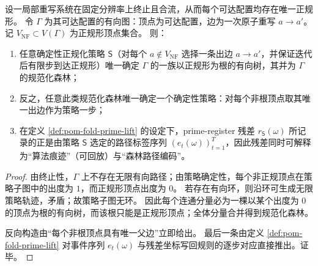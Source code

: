 \begin{theorem}\label{thm:pom-deterministic-normalization-forest}
设一局部重写系统在固定分辨率上终止且合流，从而每个可达配置均存在唯一正规形。
令 \(\Gamma\) 为其可达配置的有向图：顶点为可达配置，边为一次原子重写 \(a\to a'\)。
记 \(V_{\mathrm{NF}}\subset V(\Gamma)\) 为正规形顶点集合。
则：
\begin{enumerate}
  \item 任意确定性正规化策略 \(\mathsf S\)（对每个 \(a\notin V_{\mathrm{NF}}\) 选择一条出边 \(a\to a'\)，并保证迭代后有限步到达正规形）唯一确定 \(\Gamma\) 的一族以正规形为根的有向树，其并为 \(\Gamma\) 的规范化森林；
  \item 反之，任意此类规范化森林唯一确定一个确定性策略：对每个非根顶点取其唯一出边作为策略一步；
  \item 在定义 \ref{def:pom-fold-prime-lift} 的设定下，prime-register 残差 \(r_{\mathsf S}(\omega)\) 所记录的正是由策略 \(\mathsf S\) 选定的路径标签序列 \((e_t(\omega))_{t=1}^{T}\)，因此残差同时可解释为“算法痕迹”（可回放）与“森林路径编码”。
\end{enumerate}
\end{theorem}
\begin{proof}
由终止性，\(\Gamma\) 上不存在无限有向路径；由策略确定性，每个非正规顶点在策略子图中的出度为 \(1\)，而正规形顶点出度为 \(0\)。
若存在有向环，则沿环可生成无限策略轨迹，矛盾；故策略子图无环。
因此每个连通分量必为一棵以某个出度为 \(0\) 的顶点为根的有向树，而该根只能是正规形顶点；全体分量合并得到规范化森林。
\par
反向构造由“每个非根顶点具有唯一父边”立即给出。
最后一条由定义 \ref{def:pom-fold-prime-lift} 对事件序列 \(e_t(\omega)\) 与残差坐标写回规则的逐步对应直接推出。证毕。
\end{proof}

